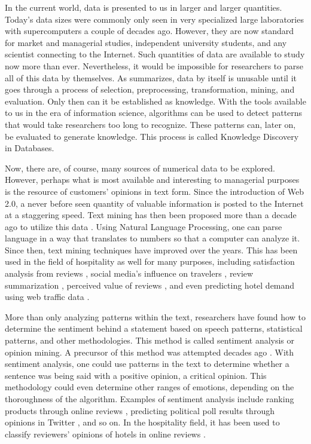 \documentclass[smallextended,natbib]{svjour3}       %
\begin{document}
    In the current world, data is presented to us in larger and larger quantities. Today's data sizes were commonly only seen in very specialized large laboratories with supercomputers a couple of decades ago. However, they are now standard for market and managerial studies, independent university students, and any scientist connecting to the Internet. Such quantities of data are available to study now more than ever. Nevertheless, it would be impossible for researchers to parse all of this data by themselves. As \cite{fayyad1996data} summarizes, data by itself is unusable until it goes through a process of selection, preprocessing, transformation, mining, and evaluation. Only then can it be established as knowledge. With the tools available to us in the era of information science, algorithms can be used to detect patterns that would take researchers too long to recognize. These patterns can, later on, be evaluated to generate knowledge. This process is called Knowledge Discovery in Databases. 

    Now, there are, of course, many sources of numerical data to be explored.  However, perhaps what is most available and interesting to managerial purposes is the resource of customers' opinions in text form. Since the introduction of Web 2.0, a never before seen quantity of valuable information is posted to the Internet at a staggering speed. Text mining has then been proposed more than a decade ago to utilize this data \cite[e.g.][]{rajman1998text,nahm2002text}. Using Natural Language Processing, one can parse language in a way that translates to numbers so that a computer can analyze it. Since then, text mining techniques have improved over the years. This has been used in the field of hospitality as well for many purposes, including satisfaction analysis from reviews \cite[e.g][]{berezina2016, xu2016, xiang2015, hargreaves2015, balbi2018}, social media's influence on travelers \cite[e.g.][]{xiang2010}, review summarization \cite[e.g.][]{hu2017436}, perceived value of reviews \cite[e.g][]{FANG2016498}, and even predicting hotel demand using web traffic data \cite[e.g][]{yang2014}.

    More than only analyzing patterns within the text, researchers have found how to determine the sentiment behind a statement based on speech patterns, statistical patterns, and other methodologies. This method is called sentiment analysis or opinion mining. A precursor of this method was attempted decades ago \cite[][]{stone1966general}. With sentiment analysis, one could use patterns in the text to determine whether a sentence was being said with a positive opinion, a critical opinion. This methodology could even determine other ranges of emotions, depending on the thoroughness of the algorithm. Examples of sentiment analysis include ranking products through online reviews \cite[e.g][]{liu2017149, zhang2011}, predicting political poll results through opinions in Twitter \cite[][]{oconnor2010}, and so on. In the hospitality field, it has been used to classify reviewers' opinions of hotels in online reviews \cite[e.g.][]{kim2017362, alsmadi2018}. 
\end{document}
